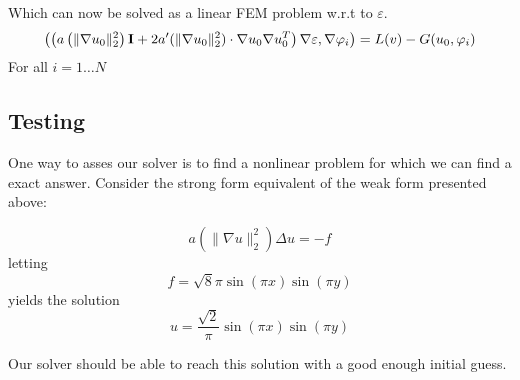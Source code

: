 \documentclass[a4paper]{article}
\begin{document}
Which can now be solved as a linear FEM problem w.r.t to $\varepsilon$.
\begin{equation}
\left( \left(a\left(\|\nabla u_0 \|_2^2\right)\mathbf{I}+2a'(\|\nabla u_0\|_2^2)\cdot \nabla u_0 \nabla u_0^T\right)\nabla \varepsilon,\nabla \varphi_i \right) = L(v)-G(u_0,\varphi_i) \\
\end{equation}
For all $i=1\ldots N$

\subsection*{Testing}
One way to asses our solver is to find a nonlinear problem for which we can find a exact answer. 
Consider the strong form equivalent of the weak form presented above:

\begin{equation*}
a\left(\|\nabla u \|_2^2\right)\Delta u = -f 
\end{equation*}
letting
\begin{equation*}
	f = \sqrt{8}\pi \sin(\pi x)\sin(\pi y)  
\end{equation*}
yields the solution
\begin{equation*}
	u = \frac{\sqrt{2}}{\pi} \sin(\pi x)\sin(\pi y)
\end{equation*}

Our solver should be able to reach this solution with a good enough initial guess.

\clearpage
%
\end{document}
